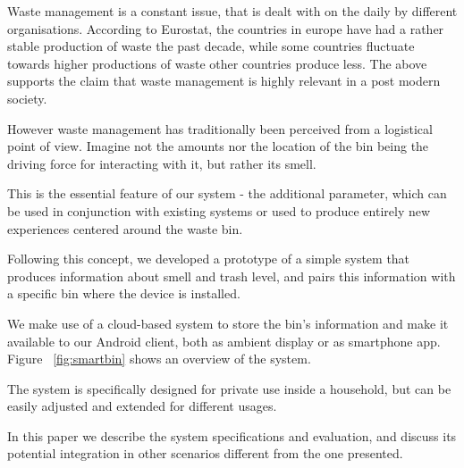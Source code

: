 Waste management is a constant issue, that is dealt with on the daily by different organisations.
According to Eurostat, the countries in europe have had a rather stable production of waste the past decade, while some countries fluctuate towards higher productions of waste other countries produce less. 
The above supports the claim that waste management is highly relevant in a post modern society.

However waste management has traditionally been perceived from a logistical point of view.
Imagine not the amounts nor the location of the bin being the driving force for interacting with it, but rather its smell.

This is the essential feature of our system - the additional parameter, which can be used in conjunction with existing systems or used to produce entirely new experiences centered around the waste bin.

Following this concept, we developed a prototype of a simple system that produces information about smell and trash level, and pairs this information with a specific bin where the device is installed. 

We make use of a cloud-based system to store the bin's information and make it available to our Android client, both as ambient display or as smartphone app.
Figure ~\ref{fig:smartbin} shows an overview of the system.

The system is specifically designed for private use inside a household, but can be easily adjusted and extended for different usages.

In this paper we describe the system specifications and evaluation, and discuss its potential integration in other scenarios different from the one presented.

